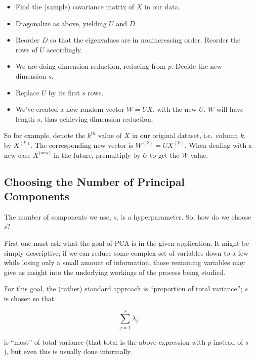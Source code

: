 \begin{itemize}

\item Find the (sample) covariance matrix of $X$ in our data.

\item Diagonalize as above, yielding $U$ and $D$.

\item Reorder $D$ so that the eigenvalues are in nonincreasing order.
Reorder the rows of $U$ accordingly.

\item We are doing dimension reduction, reducing from $p$.  
Decide the new dimension $s$.

\item Replace $U$ by its first $s$ rows.

\item We've created a new random vector $W = UX$, with the new $U$.
$W$ will have length $s$, thus achieving dimension reduction.

\end{itemize} 

So for example, denote the $k^{th}$ value of $X$ in our original
dataset, i.e.\ column $k$, by $X^{(k)}$.  The corresponding new vector
is $W^{(k)} = U X^{(k)}$.  When dealing with a new case
$X^{(\textrm{new)}}$ in the future, premultiply by $U$ to get the $W$
value.


\subsection{Choosing the Number of Principal Components}  

The number of components we use, $s$, is a hyperparameter.  So, how do
we choose $s$?  

First one must ask what the goal of PCA is in the given application.
It might be simply descriptive; if we can reduce some complex set of
variables down to a few while losing only a small amount of
information, those remaining variables may give us insight into the
underlying workings of the process being studied.

For this goal, the (rather) standard approach is ``proportion of total
variance''; $s$ is chosen so that 

\begin{equation} 
\sum_{j=1}^s \lambda_j
\end{equation}

is ``most'' of total variance (that total is the above expression
with $p$ instead of $s$), but even this is usually done informally.

